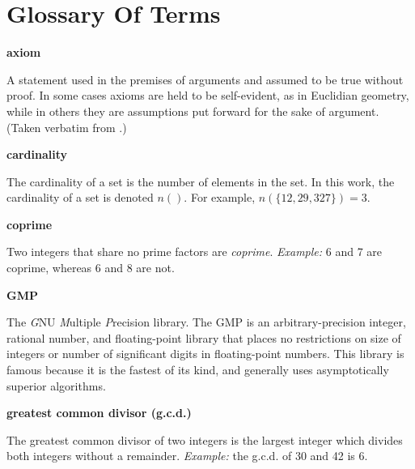 
\chapter*{Glossary Of Terms}

\label{cglo0}

\begin{vworktermglossaryenum}

\item \textbf{axiom}

      A statement used in the premises of arguments and assumed to be true
	  without proof.  In some cases axioms are held to be self-evident, as in 
	  Euclidian geometry, while in others they are assumptions put forward for
	  the sake of argument.
      (Taken verbatim from \cite{bibref:b:penguindictionaryofmathematics:2ded}.)

\item \textbf{cardinality}

      The cardinality of a set is the
      number of elements in the set.  In this work, the cardinality
      of a set is denoted $n()$.  For example, 
      $n(\{12,29,327\}) = 3$.

\item \textbf{coprime}

      Two integers that share no prime factors are \emph{coprime}.
      \emph{Example:}
      6 and 7 are coprime, whereas 6 and 8 are not.

\item \textbf{GMP}

      The \emph{G}NU \emph{M}ultiple \emph{P}recision library.
      The GMP is an arbitrary-precision integer, rational number,
      and floating-point library that places no restrictions on
      size of integers or number of significant digits in floating-point
      numbers.  This 
      library is famous because it is the fastest of its
      kind, and generally uses asymptotically superior algorithms.

\item \textbf{greatest common divisor (g.c.d.)}

      The greatest common divisor of two integers is the largest
      integer which divides both integers without a remainder.
      \emph{Example:} the g.c.d. of 30 and 42 is 6.


\end{vworktermglossaryenum}
